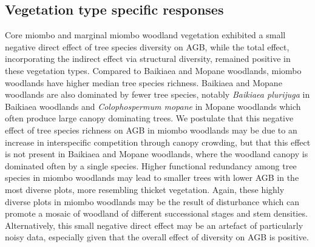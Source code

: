 \documentclass[11pt,a4paper]{article}
\begin{document}
\subsection*{Vegetation type specific responses}


Core miombo and marginal miombo woodland vegetation exhibited a small negative direct effect of tree species diversity on AGB, while the total effect, incorporating the indirect effect via  structural diversity, remained positive in these vegetation types. Compared to Baikiaea and Mopane woodlands, miombo woodlands have higher median tree species richness. Baikiaea and Mopane woodlands are also dominated by fewer tree species, notably \textit{Baikiaea plurijuga} in Baikiaea woodlands and \textit{Colophospermum mopane} in Mopane woodlands which often produce large canopy dominating trees. We postulate that this negative effect of tree species richness on AGB in miombo woodlands may be due to an increase in interspecific competition through canopy crowding, but that this effect is not present in Baikiaea and Mopane woodlands, where the woodland canopy is dominated often by a single species. Higher functional redundancy among tree species in miombo woodlands may lead to smaller trees with lower AGB in the most diverse plots, more resembling thicket vegetation. Again, these highly diverse plots in miombo woodlands may be the result of disturbance which can promote a mosaic of woodland of different successional stages and stem densities. Alternatively, this small negative direct effect may be an artefact of particularly noisy data, especially given that the overall effect of diversity on AGB is positive.
\end{document}
